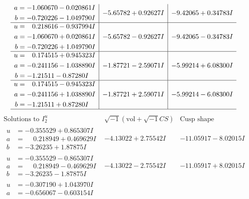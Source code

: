 \documentclass[1p]{elsarticle_modified}
\theoremstyle{definition}
\newcommand{\I}{\sqrt{-1}}
\begin{document}
$$\begin{array}{c|c|c}
\begin{aligned}
a &= -1.060670 - 0.020861 I \\
b &= -0.720226 - 1.049790 I\end{aligned}
 & -5.65782 + 0.92627 I & -9.42065 + 0.34783 I \\ \hline\begin{aligned}
u &= \phantom{-}0.218616 - 0.937994 I \\
a &= -1.060670 + 0.020861 I \\
b &= -0.720226 + 1.049790 I\end{aligned}
 & -5.65782 - 0.92627 I & -9.42065 - 0.34783 I \\ \hline\begin{aligned}
u &= \phantom{-}0.174515 + 0.945323 I \\
a &= -0.241156 - 1.038890 I \\
b &= -1.21511 - 0.87280 I\end{aligned}
 & -1.87721 - 2.59071 I & -5.99214 + 6.08300 I \\ \hline\begin{aligned}
u &= \phantom{-}0.174515 - 0.945323 I \\
a &= -0.241156 + 1.038890 I \\
b &= -1.21511 + 0.87280 I\end{aligned}
 & -1.87721 + 2.59071 I & -5.99214 - 6.08300 I\\
 \hline 
 \end{array}$$\newpage$$\begin{array}{c|c|c}  
\text{Solutions to }I^u_{2}& \I (\text{vol} + \sqrt{-1}CS) & \text{Cusp shape}\\
 \hline 
\begin{aligned}
u &= -0.355529 + 0.865307 I \\
a &= \phantom{-}0.218949 + 0.469629 I \\
b &= -3.26235 + 1.87875 I\end{aligned}
 & -4.13022 + 2.75542 I & -11.05917 - 8.02015 I \\ \hline\begin{aligned}
u &= -0.355529 - 0.865307 I \\
a &= \phantom{-}0.218949 - 0.469629 I \\
b &= -3.26235 - 1.87875 I\end{aligned}
 & -4.13022 - 2.75542 I & -11.05917 + 8.02015 I \\ \hline\begin{aligned}
u &= -0.307190 + 1.043970 I \\
a &= -0.656067 - 0.603154 I \\

\end{aligned}
\end{array}$$
\end{document}
